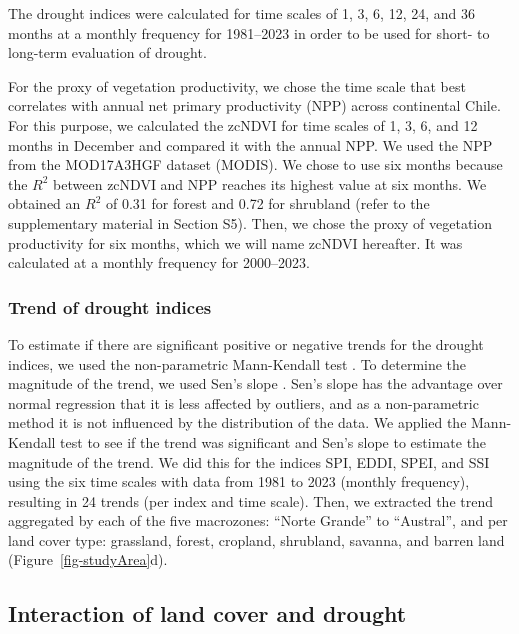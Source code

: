 \documentclass[
  authoryear,
  preprint,
  3p,
  onecolumn]{elsarticle}
\begin{document}
The drought indices were calculated for time scales of 1, 3, 6, 12, 24,
and 36 months at a monthly frequency for 1981--2023 in order to be used
for short- to long-term evaluation of drought.

For the proxy of vegetation productivity, we chose the time scale that
best correlates with annual net primary productivity (NPP) across
continental Chile. For this purpose, we calculated the zcNDVI for time
scales of 1, 3, 6, and 12 months in December and compared it with the
annual NPP. We used the NPP from the MOD17A3HGF \citep{Running2019}
dataset (MODIS). We chose to use six months because the \(R^2\) between
zcNDVI and NPP reaches its highest value at six months. We obtained an
\(R^2\) of 0.31 for forest and 0.72 for shrubland (refer to the
supplementary material in Section S5). Then, we chose the proxy of
vegetation productivity for six months, which we will name zcNDVI
hereafter. It was calculated at a monthly frequency for 2000--2023.

\hypertarget{trend-of-drought-indices}{%
\subsubsection{Trend of drought
indices}\label{trend-of-drought-indices}}

To estimate if there are significant positive or negative trends for the
drought indices, we used the non-parametric Mann-Kendall test
\citep{Kendall1975}. To determine the magnitude of the trend, we used
Sen's slope \citep{Sen1968}. Sen's slope has the advantage over normal
regression that it is less affected by outliers, and as a non-parametric
method it is not influenced by the distribution of the data. We applied
the Mann-Kendall test to see if the trend was significant and Sen's
slope to estimate the magnitude of the trend. We did this for the
indices SPI, EDDI, SPEI, and SSI using the six time scales with data
from 1981 to 2023 (monthly frequency), resulting in 24 trends (per index
and time scale). Then, we extracted the trend aggregated by each of the
five macrozones: ``Norte Grande'' to ``Austral'', and per land cover
type: grassland, forest, cropland, shrubland, savanna, and barren land
(Figure~\ref{fig-studyArea}d).

\hypertarget{interaction-of-land-cover-and-drought}{%
\subsection{Interaction of land cover and
drought}\label{interaction-of-land-cover-and-drought}}
\end{document}
